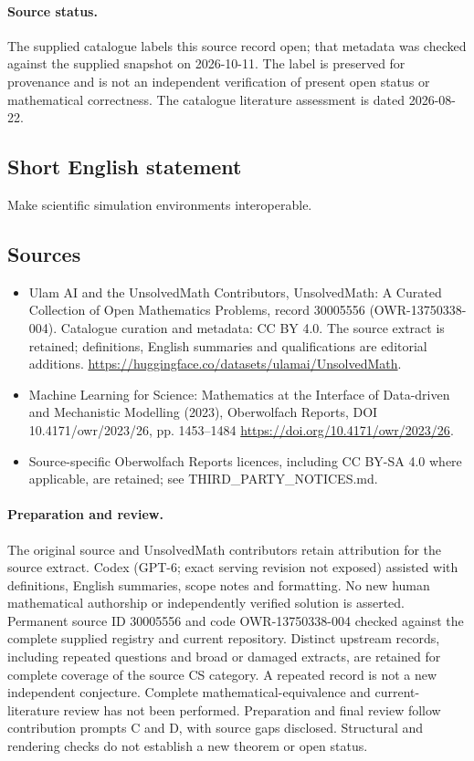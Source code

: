 \documentclass[11pt]{article}
\begin{document}
\paragraph{Source status.}
The supplied catalogue labels this source record open; that metadata was checked against the supplied snapshot on 2026-10-11. The label is preserved for provenance and is not an independent verification of present open status or mathematical correctness. The catalogue literature assessment is dated 2026-08-22.
\subsection{Short English statement}
Make scientific simulation environments interoperable.
\subsection{Sources}
\begin{itemize}
\item[S1] Ulam AI and the UnsolvedMath Contributors, UnsolvedMath: A Curated Collection of Open Mathematics Problems, record 30005556 (OWR-13750338-004). Catalogue curation and metadata: CC BY 4.0. The source extract is retained; definitions, English summaries and qualifications are editorial additions.
\url{https://huggingface.co/datasets/ulamai/UnsolvedMath}.
\item[S2] Machine Learning for Science: Mathematics at the Interface of Data-driven and Mechanistic Modelling (2023), Oberwolfach Reports, DOI 10.4171/owr/2023/26, pp. 1453--1484
\url{https://doi.org/10.4171/owr/2023/26}.
\item Source-specific Oberwolfach Reports licences, including CC BY-SA 4.0 where applicable, are retained; see THIRD\_PARTY\_NOTICES.md.
\end{itemize}
\paragraph{Preparation and review.}
The original source and UnsolvedMath contributors retain attribution for the source extract. Codex (GPT-6; exact serving revision not exposed) assisted with definitions, English summaries, scope notes and formatting. No new human mathematical authorship or independently verified solution is asserted. Permanent source ID 30005556 and code OWR-13750338-004 checked against the complete supplied registry and current repository. Distinct upstream records, including repeated questions and broad or damaged extracts, are retained for complete coverage of the source CS category. A repeated record is not a new independent conjecture. Complete mathematical-equivalence and current-literature review has not been performed. Preparation and final review follow contribution prompts C and D, with source gaps disclosed. Structural and rendering checks do not establish a new theorem or open status.
\label{end:30005556}
\end{document}
